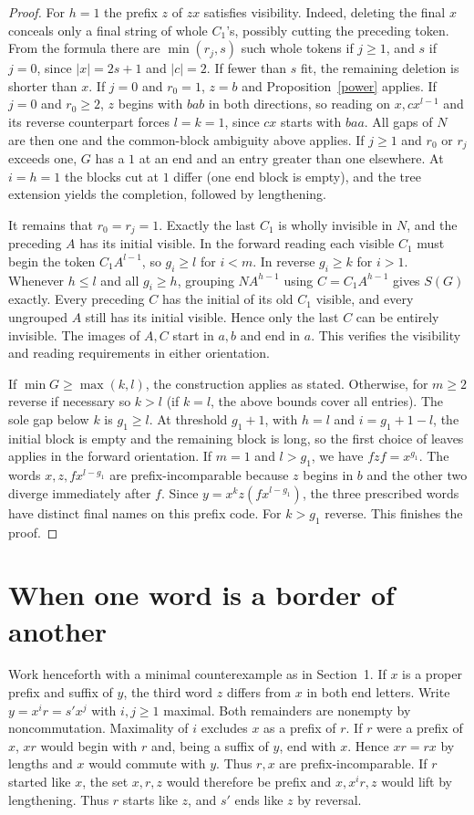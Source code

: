 \documentclass[11pt,a4paper]{article}
\begin{document}
\begin{proof}
For $h=1$ the prefix $z$ of $zx$ satisfies visibility. Indeed, deleting the final $x$ conceals only a final string of whole $C_1$'s, possibly cutting the preceding token. From the formula there are $\min(r_j,s)$ such whole tokens if $j\ge1$, and $s$ if $j=0$, since $|x|=2s+1$ and $|c|=2$. If fewer than $s$ fit, the remaining deletion is shorter than $x$. If $j=0$ and $r_0=1$, $z=b$ and Proposition~\ref{power} applies. If $j=0$ and $r_0\ge2$, $z$ begins with $bab$ in both directions, so reading on $x,cx^{l-1}$ and its reverse counterpart forces $l=k=1$, since $cx$ starts with $baa$. All gaps of $N$ are then one and the common-block ambiguity above applies. If $j\ge1$ and $r_0$ or $r_j$ exceeds one, $G$ has a $1$ at an end and an entry greater than one elsewhere. At $i=h=1$ the blocks cut at $1$ differ (one end block is empty), and the tree extension yields the completion, followed by lengthening.

It remains that $r_0=r_j=1$. Exactly the last $C_1$ is wholly invisible in $N$, and the preceding $A$ has its initial visible. In the forward reading each visible $C_1$ must begin the token $C_1 A^{l-1}$, so $g_i\ge l$ for $i<m$. In reverse $g_i\ge k$ for $i>1$. Whenever $h\le l$ and all $g_i\ge h$, grouping $N A^{h-1}$ using $C=C_1 A^{h-1}$ gives $S(G)$ exactly. Every preceding $C$ has the initial of its old $C_1$ visible, and every ungrouped $A$ still has its initial visible. Hence only the last $C$ can be entirely invisible. The images of $A,C$ start in $a,b$ and end in $a$. This verifies the visibility and reading requirements in either orientation.

If $\min G\ge\max(k,l)$, the construction applies as stated. Otherwise, for $m\ge2$ reverse if necessary so $k>l$ (if $k=l$, the above bounds cover all entries). The sole gap below $k$ is $g_1\ge l$. At threshold $g_1+1$, with $h=l$ and $i=g_1+1-l$, the initial block is empty and the remaining block is long, so the first choice of leaves applies in the forward orientation. If $m=1$ and $l>g_1$, we have $f z f=x^{g_1}$. The words $x,z,f x^{l-g_1}$ are prefix-incomparable because $z$ begins in $b$ and the other two diverge immediately after $f$. Since $y=x^k z(f x^{l-g_1})$, the three prescribed words have distinct final names on this prefix code. For $k>g_1$ reverse. This finishes the proof.
\end{proof}
\section{When one word is a border of another}
Work henceforth with a minimal counterexample as in Section~1. If $x$ is a proper prefix and suffix of $y$, the third word $z$ differs from $x$ in both end letters. Write $y=x^i r=s' x^j$ with $i,j\ge1$ maximal. Both remainders are nonempty by noncommutation. Maximality of $i$ excludes $x$ as a prefix of $r$. If $r$ were a prefix of $x$, $xr$ would begin with $r$ and, being a suffix of $y$, end with $x$. Hence $xr=rx$ by lengths and $x$ would commute with $y$. Thus $r,x$ are prefix-incomparable. If $r$ started like $x$, the set $x,r,z$ would therefore be prefix and $x,x^i r,z$ would lift by lengthening. Thus $r$ starts like $z$, and $s'$ ends like $z$ by reversal.
\end{document}

